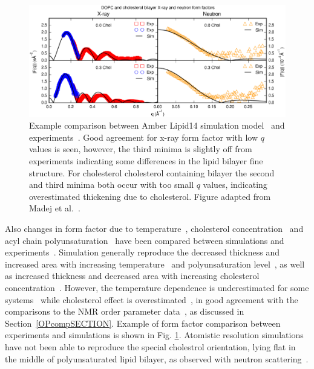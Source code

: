\documentclass[aps,prl,superscriptaddress,twocolumn]{revtex4}
\begin{document}
\begin{figure}[]
  \includegraphics[width=17.2cm]{../Fig/FFcompMADEJ.eps}
\newline
  \caption{\label{FFcomp}
    Example comparison between Amber Lipid14 simulation model~\cite{madej15} and experiments~\cite{pan09,kucerka07b}.
    Good agreement for x-ray form factor with low $q$ values is seen, however, the third minima is slightly off from experiments indicating
    some differences in the lipid bilayer fine structure. For cholesterol cholesterol containing bilayer the second and third minima
    both occur with too small $q$ values, indicating overestimated thickening due to cholesterol. Figure adapted from Madej et al.~\cite{madej15}.
  } 
\end{figure}

Also changes in form factor due to temperature~\cite{jambeck12,zhuang14}, cholesterol concentration~\cite{jambeck13,madej15} 
and acyl chain polyunsaturation~\cite{eldho03,klauda12} have been compared between simulations and 
experiments~\cite{eldho03,kucerka05a,pan08,hodzic08,kucerka08,pan09,khelasvili10,kucerka11}.
Simulation generally reproduce the decreased thickness and increased area with increasing temperature~\cite{jambeck12,zhuang14} and 
polyunsaturation level~\cite{eldho03,klauda12}, 
as well as increased thickness and decreased area with increasing cholesterol concentration~\cite{jambeck13,madej15}.
However, the temperature dependence is underestimated for some systems~\cite{jambeck12,zhuang14} while cholesterol
effect is overestimated~\cite{jambeck13,madej15}, in good agreement with the comparisons to the NMR order parameter 
data~\cite{zhuang14,madej15}, as discussed in Section~\ref{OPcompSECTION}. Example of form factor comparison 
between experiments and simulations is shown in Fig. \ref{FFcomp}.
Atomistic resolution simulations have not been able to reproduce the special cholestrol orientation, lying flat in
the middle of polyunsaturated lipid bilayer, as observed with neutron scattering~\cite{harroun08,marrink08,kucerka10b}.
\end{document}
